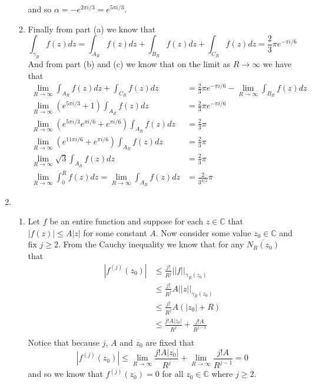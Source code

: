 \documentclass[12pt]{amsart}
\theoremstyle{definition}
\newcommand{\C}{\mathbb{C}}
\newcommand{\ra}{\rightarrow}
\newcommand{\abs}[1]{\left| #1 \right|}
\newcommand{\overbar}[1]{\overline{#1}}
\begin{document}
\begin{enumerate}
\begin{enumerate}
    and so $\alpha=-e^{2\pi i /3}=e^{5\pi i /3}$.

    \item Finally from part (a) we know that
    $$\int_{\gamma_R}f(z)dz=\int_{A_R}f(z)dz+\int_{B_R}f(z)dz+\int_{C_R}f(z)dz=\frac{2}{3}\pi e^{-\pi i /6}$$
    And from part (b) and (c) we know that on the limit as $R\ra \infty$ we have that 
    \begin{align*}
    \lim_{R\ra \infty}\int_{A_R}f(z)dz+\int_{C_R}f(z)dz&=\frac{2}{3}\pi e^{-\pi i /6}-\lim_{R\ra \infty}\int_{B_R}f(z)dz\\
    \lim_{R\ra \infty}(e^{5\pi i /3}+1)\int_{A_R}f(z)dz&=\frac{2}{3}\pi e^{-\pi i /6}\\
    \lim_{R\ra \infty}(e^{5\pi i /3}e^{\pi i /6}+e^{\pi i /6})\int_{A_R}f(z)dz&=\frac{2}{3}\pi\\
    \lim_{R\ra \infty}(e^{11\pi i /6}+e^{\pi i /6})\int_{A_R}f(z)dz&=\frac{2}{3}\pi \\
    \lim_{R\ra \infty}\sqrt{3}\int_{A_R}f(z)dz&=\frac{2}{3}\pi\\
    \lim_{R\ra \infty}\int_{0}^R f(z)dz=\lim_{R\ra \infty}\int_{A_R}f(z)dz&=\frac{2}{3^{3/2}}\pi
    \end{align*}
\end{enumerate}

\item 
\begin{enumerate}
    \item Let $f$ be an entire function and suppose for each $z\in \C$ that $|f(z)|\leq A|z|$ for some constant $A$. Now consider some value $z_0\in \C$ and fix $j\geq 2$. From the Cauchy inequality we know that for any $\overbar{N_R(z_0)}$ that
    \begin{align*}
        \abs{f^{(j)}(z_0)}&\leq \frac{j!}{R^j}||f||_{\gamma_R(z_0)} \\
        &\leq \frac{j!}{R^j}A||z||_{\gamma_R(z_0)}\\
        &\leq \frac{j!}{R^j}A(|z_0|+R)\\
        &\leq \frac{j!A|z_0|}{R^j}+\frac{j!A}{R^{j-1}}\\
    \end{align*}
    Notice that because $j$, $A$ and $z_0$ are fixed that $$\abs{f^{(j)}(z_0)}\leq \lim_{R\ra \infty}\frac{j!A|z_0|}{R^j}+\lim_{R\ra \infty}\frac{j!A}{R^{j-1}}=0$$
    and so we know that $f^{(j)}(z_0)=0$ for all $z_0\in\C$ where $j\geq 2$.\\
    

\end{enumerate}
\end{enumerate}
\end{document}
